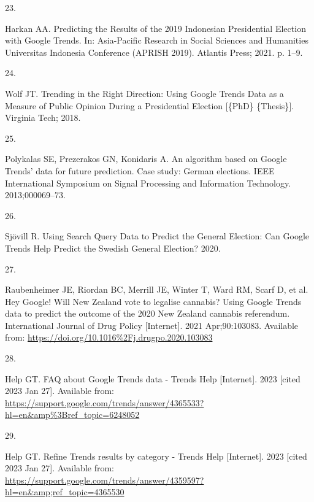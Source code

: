 \documentclass[
  letterpaper,
  DIV=11,
  numbers=noendperiod]{scrartcl}
\newlength{\cslhangindent}
\newlength{\csllabelwidth}
\newlength{\cslentryspacingunit} %
\newenvironment{CSLReferences}[2] %
 {%
  \setlength{\parindent}{0pt}
  \ifodd #1
  \let\oldpar\par
  \def\par{\hangindent=\cslhangindent\oldpar}
  \fi
  \setlength{\parskip}{#2\cslentryspacingunit}
 }%
 {}
\newcommand{\CSLLeftMargin}[1]{\parbox[t]{\csllabelwidth}{#1}}
\newcommand{\CSLRightInline}[1]{\parbox[t]{\linewidth - \csllabelwidth}{#1}\break}
\begin{document}
\begin{CSLReferences}{0}{0}
\leavevmode{}%
\CSLLeftMargin{23. }%
\CSLRightInline{Harkan AA. Predicting the {Results} of the 2019
{Indonesian} {Presidential} {Election} with {Google} {Trends}. In:
Asia-{Pacific} {Research} in {Social} {Sciences} and {Humanities}
{Universitas} {Indonesia} {Conference} ({APRISH} 2019). Atlantis Press;
2021. p. 1--9. }

\leavevmode{}%
\CSLLeftMargin{24. }%
\CSLRightInline{Wolf JT. Trending in the {Right} {Direction}: {Using}
{Google} {Trends} {Data} as a {Measure} of {Public} {Opinion} {During} a
{Presidential} {Election} {[}\{PhD\} \{Thesis\}{]}. Virginia Tech; 2018.
}

\leavevmode{}%
\CSLLeftMargin{25. }%
\CSLRightInline{Polykalas SE, Prezerakos GN, Konidaris A. An algorithm
based on {Google} {Trends}' data for future prediction. {Case} study:
{German} elections. IEEE International Symposium on Signal Processing
and Information Technology. 2013;000069--73. }

\leavevmode{}%
\CSLLeftMargin{26. }%
\CSLRightInline{Sjövill R. Using {Search} {Query} {Data} to {Predict}
the {General} {Election}: {Can} {Google} {Trends} {Help} {Predict} the
{Swedish} {General} {Election}? 2020. }

\leavevmode{}%
\CSLLeftMargin{27. }%
\CSLRightInline{Raubenheimer JE, Riordan BC, Merrill JE, Winter T, Ward
RM, Scarf D, et al. Hey {Google}! Will {New} {Zealand} vote to legalise
cannabis? {Using} {Google} {Trends} data to predict the outcome of the
2020 {New} {Zealand} cannabis referendum. International Journal of Drug
Policy {[}Internet{]}. 2021 Apr;90:103083. Available from:
\url{https://doi.org/10.1016\%2Fj.drugpo.2020.103083}}

\leavevmode{}%
\CSLLeftMargin{28. }%
\CSLRightInline{Help GT. {FAQ} about {Google} {Trends} data - {Trends}
{Help} {[}Internet{]}. 2023 {[}cited 2023 Jan 27{]}. Available from:
\url{https://support.google.com/trends/answer/4365533?hl=en\&amp\%3Bref_topic=6248052}}

\leavevmode{}%
\CSLLeftMargin{29. }%
\CSLRightInline{Help GT. Refine {Trends} results by category - {Trends}
{Help} {[}Internet{]}. 2023 {[}cited 2023 Jan 27{]}. Available from:
\url{https://support.google.com/trends/answer/4359597?hl=en\&amp;ref_topic=4365530}}


\end{CSLReferences}
\end{document}
